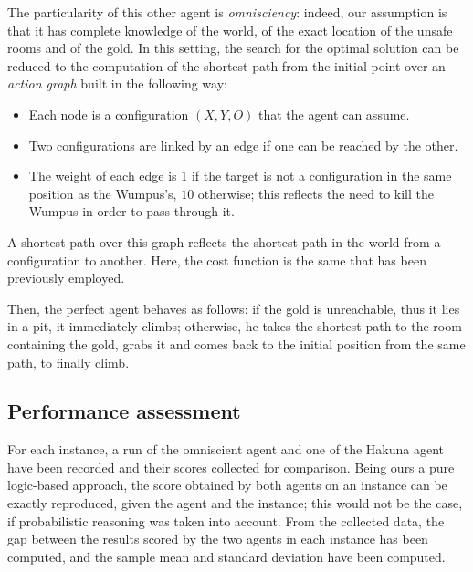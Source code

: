 \documentclass{llncs}
\begin{document}
The particularity of this other agent is \emph{omnisciency}: indeed, our assumption is that it has complete knowledge of the world, of the exact location of the unsafe rooms and of the gold.
In this setting, the search for the optimal solution can be reduced to the computation of the shortest path from the initial point over an \emph{action graph} built in the following way:
\begin{itemize}
	\item Each node is a configuration $(X,Y,O)$ that the agent can assume.
	\item Two configurations are linked by an edge if one can be reached by the other.
	\item The weight of each edge is $1$ if the target is not a configuration in the same position as the Wumpus's, $10$ otherwise; this reflects the need to kill the Wumpus in order to pass through it.
\end{itemize}
A shortest path over this graph reflects the shortest path in the world from a configuration to another.
Here, the cost function is the same that has been previously employed.

Then, the perfect agent behaves as follows: if the gold is unreachable, thus it lies in a pit, it immediately climbs; otherwise, he takes the shortest path to the room containing the gold, grabs it and comes back to the initial position from the same path, to finally climb.

\subsection{Performance assessment}

For each instance, a run of the omniscient agent and one of the Hakuna agent have been recorded and their scores collected for comparison.
Being ours a pure logic-based approach, the score obtained by both agents on an instance can be exactly reproduced, given the agent and the instance; this would not be the case, if probabilistic reasoning was taken into account.
From the collected data, the gap between the results scored by the two agents in each instance has been computed, and the sample mean and standard deviation have been computed.
\end{document}
